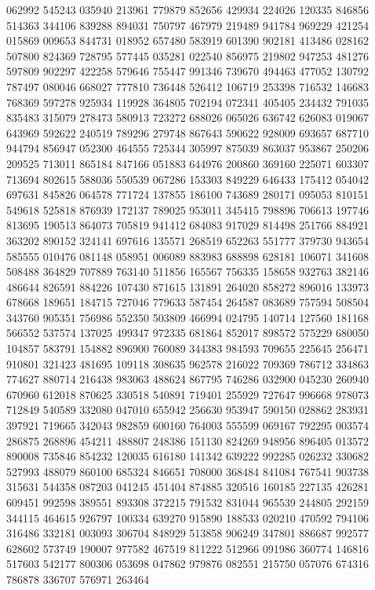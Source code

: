 {062992 545243 035940 213961 779879 852656 429934 224026 120335 846856 514363%
344106 839288 894031 750797 467979 219489 941784 969229 421254 015869 009653%
844731 018952 657480 583919 601390 902181 413486 028162 507800 824369 728795%
577445 035281 022540 856975 219802 947253 481276 597809 902297 422258 579646%
755447 991346 739670 494463 477052 130792 787497 080046 668027 777810 736448%
526412 106719 253398 716532 146683 768369 597278 925934 119928 364805 702194%
072341 405405 234432 791035 835483 315079 278473 580913 723272 688026 065026%
636742 626083 019067 643969 592622 240519 789296 279748 867643 590622 928009%
693657 687710 944794 856947 052300 464555 725344 305997 875039 863037 953867%
250206 209525 713011 865184 847166 051883 644976 200860 369160 225071 603307%
713694 802615 588036 550539 067286 153303 849229 646433 175412 054042 697631%
845826 064578 771724 137855 186100 743689 280171 095053 810151 549618 525818%
876939 172137 789025 953011 345415 798896 706613 197746 813695 190513 864073%
705819 941412 684083 917029 814498 251766 884921 363202 890152 324141 697616%
135571 268519 652263 551777 379730 943654 585555 010476 081148 058951 006089%
883983 688898 628181 106071 341608 508488 364829 707889 763140 511856 165567%
756335 158658 932763 382146 486644 826591 884226 107430 871615 131891 264020%
858272 896016 133973 678668 189651 184715 727046 779633 587454 264587 083689%
757594 508504 343760 905351 756986 552350 503809 466994 024795 140714 127560%
181168 566552 537574 137025 499347 972335 681864 852017 898572 575229 680050%
104857 583791 154882 896900 760089 344383 984593 709655 225645 256471 910801%
321423 481695 109118 308635 962578 216022 709369 786712 334863 774627 880714%
216438 983063 488624 867795 746286 032900 045230 260940 670960 612018 870625%
330518 540891 719401 255929 727647 996668 978073 712849 540589 332080 047010%
655942 256630 953947 590150 028862 283931 397921 719665 342043 982859 600160%
764003 555599 069167 792295 003574 286875 268896 454211 488807 248386 151130%
824269 948956 896405 013572 890008 735846 854232 120035 616180 141342 639222%
992285 026232 330682 527993 488079 860100 685324 846651 708000 368484 841084%
767541 903738 315631 544358 087203 041245 451404 874885 320516 160185 227135%
426281 609451 992598 389551 893308 372215 791532 831044 965539 244805 292159%
344115 464615 926797 100334 639270 915890 188533 020210 470592 794106 316486%
332181 003093 306704 848929 513858 906249 347801 886687 992577 628602 573749%
190007 977582 467519 811222 512966 091986 360774 146816 517603 542177 800306%
053698 047862 979876 082551 215750 057076 674316 786878 336707 576971 263464%
}
